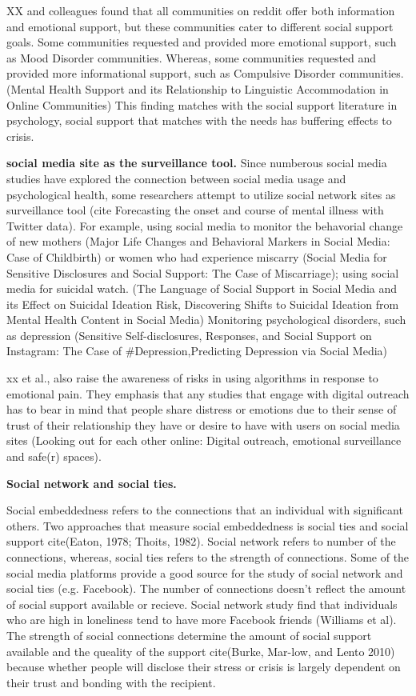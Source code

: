 XX and colleagues found that all communities on reddit offer both information and emotional support, but these communities cater to different social support goals. Some communities requested and provided more emotional support, such as Mood Disorder communities. Whereas, some communities requested and provided more informational support, such as Compulsive Disorder communities. (Mental Health Support and its Relationship to Linguistic Accommodation in Online Communities) This finding matches with the social support literature in psychology, social support that matches with the needs has buffering effects to crisis.

\textbf{social media site as the surveillance tool.} Since numberous social media studies have explored the connection between social media usage and psychological health, some researchers attempt to utilize social network sites as surveillance tool (cite Forecasting the onset and course of mental illness with Twitter data). For example, using social media to monitor the behavorial change of new mothers (Major Life Changes and Behavioral Markers in Social
Media: Case of Childbirth) or women who had experience miscarry (Social Media for Sensitive Disclosures and Social Support: The Case of Miscarriage); using social media for suicidal watch. (The Language of Social Support in Social Media and its Effect on Suicidal Ideation Risk, Discovering Shifts to Suicidal Ideation from Mental Health Content in Social Media) Monitoring psychological disorders, such as depression (Sensitive Self-disclosures, Responses, and Social Support on Instagram: The Case of #Depression,{Predicting Depression via Social Media})

xx et al., also raise the awareness of risks in using algorithms in response to emotional pain. They emphasis that any studies that engage with digital outreach has to bear in mind that people share distress or emotions due to their sense of trust of their relationship they have or desire to have with users on social media sites (Looking out for each other online: Digital outreach, emotional surveillance and safe(r) spaces).


\textbf{Social network and social ties.}

Social embeddedness refers to the connections that an individual with significant others. Two approaches that measure social embeddedness is social ties and social support cite(Eaton, 1978; Thoits, 1982). Social network refers to number of the connections, whereas, social ties refers to the strength of connections. Some of the social media platforms provide a good source for the study of social network and social ties (e.g. Facebook). The number of connections doesn't reflect the amount of social support available or recieve.  Social network study find that individuals who are high in loneliness tend to have more Facebook friends (Williams et al). The strength of social connections determine the amount of social support available and the queality of the support cite(Burke, Mar-low, and Lento 2010) because whether people will disclose their stress or crisis is largely dependent on their trust and bonding with the recipient.


